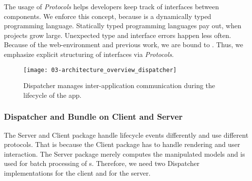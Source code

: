\documentclass[../ClassicThesis.tex]{subfiles}
\begin{document}
The usage of \emph{Protocols} helps developers keep track of interfaces between
components. We enforce this concept, because \javascript is a dynamically typed
programming language. Statically typed programming languages pay out, when
projects grow large. Unexpected type and interface errors happen less often.
Because of the web-environment and previous work, we are bound to \coffeescript.
Thus, we emphasize explicit structuring of interfaces via \emph{Protocols}.



\begin{figure}
  \centering
  \texttt{[image: 03-architecture\_overview\_dispatcher]}
  \caption{Dispatcher manages inter-application communication during the
    lifecycle of the app.}
  \label{fig:architecture_overview_dispatcher}
\end{figure}

\subsubsection{Dispatcher and Bundle on Client and Server}


The Server and Client package handle lifecycle events differently and use
different protocols. That is because the Client package has to handle rendering
and user interaction. The Server package merely computes the manipulated models
and is used for batch processing of {\threedmodel}s. Therefore, we need two
Dispatcher implementations for the client and for the server.
\end{document}
